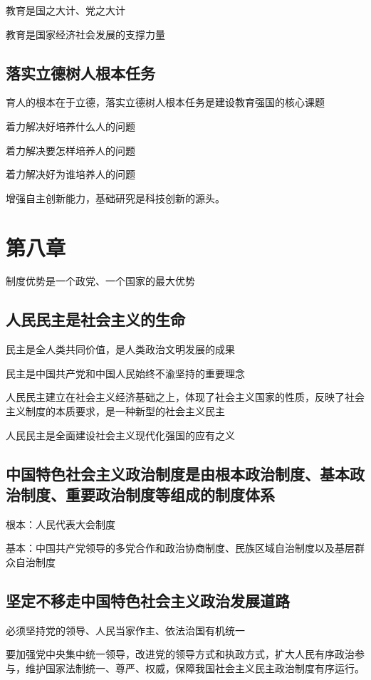 \documentclass[11pt, a4paper]{article}
\begin{document}
教育是国之大计、党之大计

教育是国家经济社会发展的支撑力量

\subsection*{落实立德树人根本任务}

育人的根本在于立德，落实立德树人根本任务是建设教育强国的核心课题

着力解决好培养什么人的问题

着力解决要怎样培养人的问题

着力解决好为谁培养人的问题

增强自主创新能力，基础研究是科技创新的源头。

\section*{第八章}

制度优势是一个政党、一个国家的最大优势

\subsection*{人民民主是社会主义的生命}

民主是全人类共同价值，是人类政治文明发展的成果

民主是中国共产党和中国人民始终不渝坚持的重要理念

人民民主建立在社会主义经济基础之上，体现了社会主义国家的性质，反映了社会主义制度的本质要求，是一种新型的社会主义民主

人民民主是全面建设社会主义现代化强国的应有之义

\subsection*{中国特色社会主义政治制度是由根本政治制度、基本政治制度、重要政治制度等组成的制度体系}

根本：人民代表大会制度

基本：中国共产党领导的多党合作和政治协商制度、民族区域自治制度以及基层群众自治制度

\subsection*{坚定不移走中国特色社会主义政治发展道路}

必须坚持党的领导、人民当家作主、依法治国有机统一

要加强党中央集中统一领导，改进党的领导方式和执政方式，扩大人民有序政治参与，维护国家法制统一、尊严、权威，保障我国社会主义民主政治制度有序运行。
\end{document}
